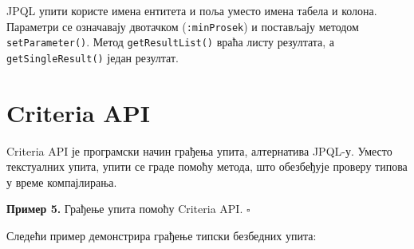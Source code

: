 JPQL упити користе имена ентитета и поља уместо имена табела и колона. Параметри се означавају двотачком (\texttt{:minProsek}) и постављају методом \texttt{setParameter()}. Метод \texttt{getResultList()} враћа листу резултата, а \texttt{getSingleResult()} један резултат.


\section{Criteria API}

Criteria API је програмски начин грађења упита, алтернатива JPQL-у. Уместо текстуалних упита, упити се граде помоћу метода, што обезбеђује проверу типова у време компајлирања.


\bigskip

\noindent \textbf{Пример 5.} Грађење упита помоћу Criteria API. $\square$

\medskip

Следећи пример демонстрира грађење типски безбедних упита:


